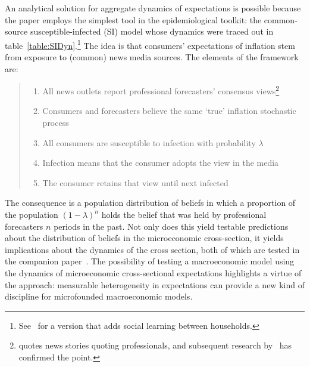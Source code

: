 An analytical solution for aggregate dynamics of expectations is possible because the paper employs the simplest tool in the epidemiological toolkit: the common-source susceptible-infected (SI) model whose dynamics were traced out in table~\ref{table:SIDyn}.\footnote{See~\cite{easaw2015households} for a version that adds social learning between households.}   The idea is that consumers' expectations of inflation stem from exposure to (common) news media sources.  The elements of the framework are:
\begin{quote}
    \normalfont
\begin{enumerate}
    \item All news outlets report professional forecasters' consensus views\footnote{\cite{carroll2003macroeconomic} quotes news stories quoting professionals, and subsequent research by~\cite{lamla2014role} has confirmed the point.}
    \item Consumers and forecasters believe the same `true' inflation stochastic process
    \item All consumers are susceptible to infection with probability $\lambda$
    \item Infection means that the consumer adopts the view in the media
    \item The consumer retains that view until next infected
\end{enumerate}
\end{quote}

The consequence is a population distribution of beliefs in which a proportion of the population $(1-\lambda)^{n}$ holds the belief that was held by professional forecasters $n$ periods in the past.  Not only does this yield testable predictions about the distribution of beliefs in the microeconomic cross-section, it yields implications about the dynamics of the cross section, both of which are tested in the companion paper~\cite{carrollEpidemiologySFI}.  The possibility of testing a macroeconomic model using the dynamics of microeconomic cross-sectional expectations highlights a virtue of the approach:  measurable heterogeneity in expectations can provide a new kind of discipline for microfounded macroeconomic models.

